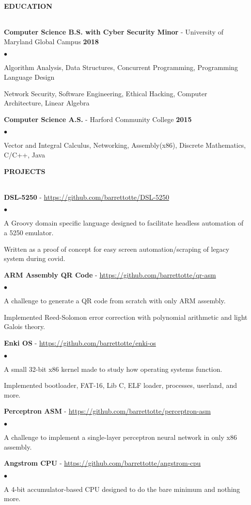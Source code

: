 \documentclass{article}
\newcommand{\lineunder}{
	\vspace*{-4pt}\\ 
	\hspace*{-18pt}\hrulefill \\
}
\newcommand{\header}[1]{
	{\hspace*{-15pt}\vspace*{6pt}\textsc{#1}}\vspace*{-6pt}\lineunder
}
\newcommand{\project}[2]{
	\vspace*{3pt} \textbf{#1} - \small{\href{#2}{#2}}
}
\newcommand{\education}[3]{
	\textbf{#1} - #2 \hfill \textbf{#3} \vspace*{3pt}
}
\newenvironment{resumelist}{
	\vspace*{2pt}
	\begin{list}
		{\small$\bullet$}{\topsep 0pt \itemsep -2pt}}{\vspace*{4pt}
	\end{list}
}
\newcommand{\resumeheader}[1]{
	\vspace*{10pt}
	\header{\textbf{#1}}
    \vspace*{3pt}
}
\begin{document}
	\resumeheader{EDUCATION}
		\education 
			{Computer Science B.S. with Cyber Security Minor}{University of Maryland Global Campus} 
			{2018}
			\begin{resumelist}
				\item Algorithm Analysis, Data Structures, Concurrent Programming, Programming Language Design
				\item Network Security, Software Engineering, Ethical Hacking, Computer Architecture, Linear Algebra
			\end{resumelist}
			\vspace*{6pt}
		\education
			{Computer Science A.S.}{Harford Community College}
			{2015}
			\begin{resumelist}
				\item Vector and Integral Calculus, Networking, Assembly(x86), Discrete Mathematics, C/C++, Java
			\end{resumelist}
	
	\resumeheader{PROJECTS}
		\project
			{DSL-5250}{https://github.com/barrettotte/DSL-5250}
			\begin{resumelist}
				\item A Groovy domain specific language designed to facilitate headless automation of a 5250 emulator.
				\item Written as a proof of concept for easy screen automation/scraping of legacy system during covid.
			\end{resumelist}
		\project
			{ARM Assembly QR Code}{https://github.com/barrettotte/qr-asm}
			\begin{resumelist}
				\item A challenge to generate a QR code from scratch with only ARM assembly.
				\item Implemented Reed-Solomon error correction with polynomial arithmetic and light Galois theory.
			\end{resumelist}
		\project
			{Enki OS}{https://github.com/barrettotte/enki-os}
			\begin{resumelist}
				\item A small 32-bit x86 kernel made to study how operating systems function.
				\item Implemented bootloader, FAT-16, Lib C, ELF loader, processes, userland, and more.
			\end{resumelist}
		\project
			{Perceptron ASM}{https://github.com/barrettotte/perceptron-asm}
			\begin{resumelist}
				\item A challenge to implement a single-layer perceptron neural network in only x86 assembly.
			\end{resumelist}
		\project
			{Angstrom CPU}{https://github.com/barrettotte/angstrom-cpu}
			\begin{resumelist}
				\item A 4-bit accumulator-based CPU designed to do the bare minimum and nothing more.
			\end{resumelist}
\end{document}
